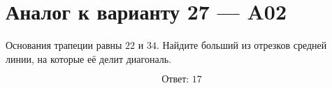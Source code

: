 


\section*{Аналог к варианту 27 — A02}
Основания трапеции равны \(22\) и \(34\). Найдите больший из отрезков средней линии, на которые её делит диагональ.
\begin{center}\figTrapezoidDiagonal\end{center}
\[\boxed{\text{Ответ: }17}\]

